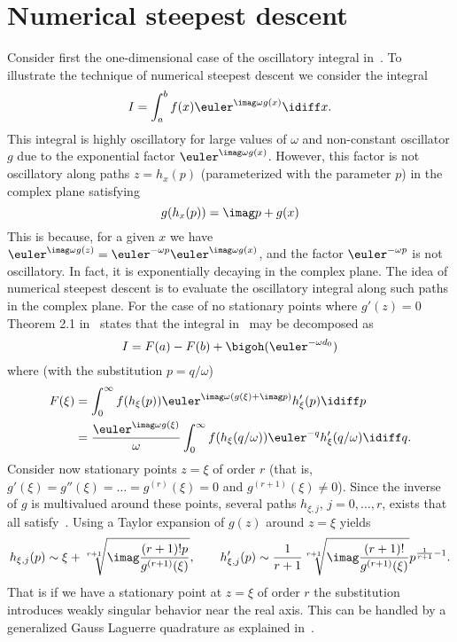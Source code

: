 \section{Numerical steepest descent}
\label{Sec4:NumericalSteepestDecent}
Consider first the one-dimensional case of the oscillatory integral in~. To illustrate the technique of numerical steepest descent we consider the integral
\begin{equation}\label{Eq:NSD1Dlinear}
	I = \int_a^b f(x) \euler^{\imag \omega g(x)}\idiff x.
\end{equation}
This integral is highly oscillatory for large values of $\omega$ and non-constant oscillator $g$ due to the exponential factor $\euler^{\imag \omega g(x)}$. However, this factor is not oscillatory along paths $z=h_x(p)$ (parameterized with the parameter $p$) in the complex plane satisfying
\begin{equation}\label{Eq4:gh_xp}
	g(h_x(p)) = \imag p + g(x)
\end{equation}
This is because, for a given $x$ we have $\euler^{\imag \omega g(z)}=\euler^{-\omega p}\euler^{\imag \omega g(x)}$, and the factor $\euler^{-\omega p}$ is not oscillatory. In fact, it is exponentially decaying in the complex plane. The idea of numerical steepest descent is to evaluate the oscillatory integral along such paths in the complex plane. For the case of no stationary points where $g'(z)=0$ Theorem 2.1 in~\cite{Huybrechs2007tco} states that the integral in~ may be decomposed as
\begin{equation*}
	I = F(a)-F(b) + \bigoh(\euler^{-\omega d_0})
\end{equation*}
where (with the substitution $p=q/\omega$)
\begin{align}\label{Eq4:F_j}
	F(\xi) &= \int_0^\infty f(h_{\xi}(p))\euler^{\imag\omega(g(\xi)+\imag p)} h_{\xi}'(p)\idiff p\\
	&= \frac{\euler^{\imag\omega g(\xi)}}{\omega}\int_0^\infty f(h_{\xi}(q/\omega))\euler^{-q} h_{\xi}'(q/\omega)\idiff q.
\end{align}
Consider now stationary points $z=\xi$ of order $r$ (that is, $g'(\xi)=g''(\xi)=\dots=g^{(r)}(\xi) = 0$ and $g^{(r+1)}(\xi)\not=0$). Since the inverse of $g$ is multivalued around these points, several paths $h_{\xi,j}$, $j=0,\dots,r$, exists that all satisfy~. Using a Taylor expansion of $g(z)$ around $z=\xi$ yields
\begin{equation*}
	h_{\xi,j}(p) \sim \xi + \sqrt[r+1]{\imag\frac{(r+1)!p}{g^{(r+1)}(\xi)}},\qquad h_{\xi,j}'(p) \sim \frac{1}{r+1}\sqrt[r+1]{\imag\frac{(r+1)!}{g^{(r+1)}(\xi)}}p^{\frac{1}{r+1}-1}.
\end{equation*}
That is if we have a stationary point at $z=\xi$ of order $r$ the substitution introduces weakly singular behavior near the real axis. This can be handled by a generalized Gauss Laguerre quadrature as explained in~\cite{Huybrechs2007tco}.

